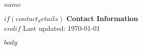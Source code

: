 \documentclass[10pt]{article}
\def\name{$name$}
\newcommand{\contactinfo}[0]{
\begin{flushright}
  $if(contact_details)$
  \textcolor{sectioncolor}{\textbf{Contact Information}} \\
  
  $endif$
  Last updated: \today
\end{flushright}
}
\begin{document}
\noindent
\begin{minipage}[t]{0.5\textwidth}
  {\huge \name}
\end{minipage}%
\begin{minipage}[t]{0.5\textwidth}
  \contactinfo{}
\end{minipage}


$body$
\end{document}
